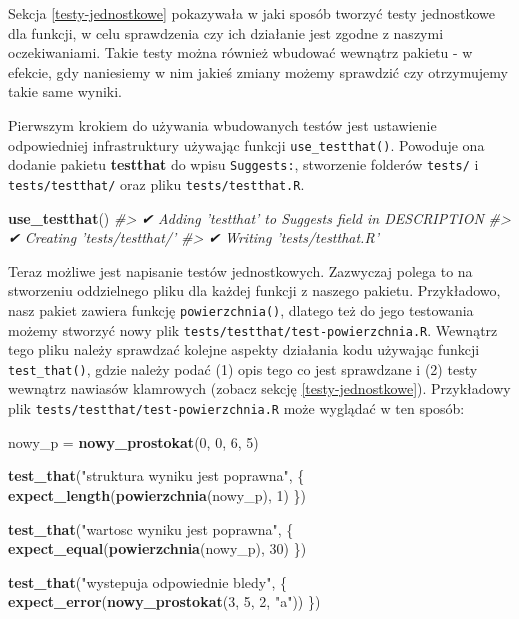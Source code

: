 \documentclass[paper=6in:9in,pagesize=pdftex,headinclude=on,footinclude=on,10pt]{scrbook}
\newenvironment{Shaded}{\begin{snugshade}}{\end{snugshade}}
\newcommand{\CommentTok}[1]{\textcolor[rgb]{0.56,0.35,0.01}{\textit{#1}}}
\newcommand{\DecValTok}[1]{\textcolor[rgb]{0.00,0.00,0.81}{#1}}
\newcommand{\KeywordTok}[1]{\textcolor[rgb]{0.13,0.29,0.53}{\textbf{#1}}}
\newcommand{\NormalTok}[1]{#1}
\newcommand{\StringTok}[1]{\textcolor[rgb]{0.31,0.60,0.02}{#1}}
\begin{document}
Sekcja \ref{testy-jednostkowe} pokazywała w jaki sposób tworzyć testy jednostkowe dla funkcji, w celu sprawdzenia czy ich działanie jest zgodne z naszymi oczekiwaniami.
Takie testy można również wbudować wewnątrz pakietu - w efekcie, gdy naniesiemy w nim jakieś zmiany możemy sprawdzić czy otrzymujemy takie same wyniki.

Pierwszym krokiem do używania wbudowanych testów jest ustawienie odpowiedniej infrastruktury używając funkcji \texttt{use\_testthat()}.
Powoduje ona dodanie pakietu \textbf{testthat} do wpisu \texttt{Suggests:}, stworzenie folderów \texttt{tests/} i \texttt{tests/testthat/} oraz pliku \texttt{tests/testthat.R}.

\begin{Shaded}
\begin{Highlighting}[]
\KeywordTok{use_testthat}\NormalTok{()}
\CommentTok{#> ✔ Adding 'testthat' to Suggests field in DESCRIPTION}
\CommentTok{#> ✔ Creating 'tests/testthat/'}
\CommentTok{#> ✔ Writing 'tests/testthat.R'}
\end{Highlighting}
\end{Shaded}

Teraz możliwe jest napisanie testów jednostkowych.
Zazwyczaj polega to na stworzeniu oddzielnego pliku dla każdej funkcji z naszego pakietu.
Przykładowo, nasz pakiet zawiera funkcję \texttt{powierzchnia()}, dlatego też do jego testowania możemy stworzyć nowy plik \texttt{tests/testthat/test-powierzchnia.R}.
Wewnątrz tego pliku należy sprawdzać kolejne aspekty działania kodu używając funkcji \texttt{test\_that()}, gdzie należy podać (1) opis tego co jest sprawdzane i (2) testy wewnątrz nawiasów klamrowych (zobacz sekcję \ref{testy-jednostkowe}).
Przykładowy plik \texttt{tests/testthat/test-powierzchnia.R} może wyglądać w ten sposób:

\begin{Shaded}
\begin{Highlighting}[]
\NormalTok{nowy_p =}\StringTok{ }\KeywordTok{nowy_prostokat}\NormalTok{(}\DecValTok{0}\NormalTok{, }\DecValTok{0}\NormalTok{, }\DecValTok{6}\NormalTok{, }\DecValTok{5}\NormalTok{)}

\KeywordTok{test_that}\NormalTok{(}\StringTok{"struktura wyniku jest poprawna"}\NormalTok{, \{}
  \KeywordTok{expect_length}\NormalTok{(}\KeywordTok{powierzchnia}\NormalTok{(nowy_p), }\DecValTok{1}\NormalTok{)}
\NormalTok{\})}

\KeywordTok{test_that}\NormalTok{(}\StringTok{"wartosc wyniku jest poprawna"}\NormalTok{, \{}
  \KeywordTok{expect_equal}\NormalTok{(}\KeywordTok{powierzchnia}\NormalTok{(nowy_p), }\DecValTok{30}\NormalTok{)}
\NormalTok{\})}

\KeywordTok{test_that}\NormalTok{(}\StringTok{"wystepuja odpowiednie bledy"}\NormalTok{, \{}
  \KeywordTok{expect_error}\NormalTok{(}\KeywordTok{nowy_prostokat}\NormalTok{(}\DecValTok{3}\NormalTok{, }\DecValTok{5}\NormalTok{, }\DecValTok{2}\NormalTok{, }\StringTok{"a"}\NormalTok{))}
\NormalTok{\})}
\end{Highlighting}
\end{Shaded}
\end{document}

